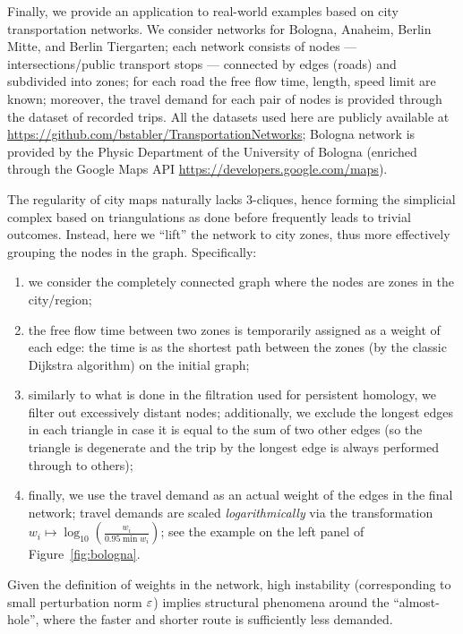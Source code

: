 Finally, we provide an application to  real-world examples based on city transportation networks. 
We consider networks for Bologna, Anaheim, Berlin Mitte, and Berlin Tiergarten; each network consists of nodes --- intersections/public transport stops --- connected by edges (roads) and subdivided into zones; for each road the free flow time, length, speed limit are known; moreover, the travel demand for each pair of nodes is provided through the dataset of recorded trips.
All the datasets used here are publicly available at \url{https://github.com/bstabler/TransportationNetworks}; Bologna network is  provided by the Physic Department of the University of Bologna (enriched through the Google Maps API \url{https://developers.google.com/maps}).

The regularity of city maps naturally lacks $3$-cliques, hence forming the simplicial complex based on triangulations as done before frequently leads to trivial outcomes. 
Instead, here we ``lift'' the network to city zones, thus more effectively grouping the nodes in the graph. Specifically:
\begin{enumerate}
    \item we consider the completely connected graph where the nodes are zones in the city/region;
    \item the free flow time between two zones is temporarily assigned  as a weight of each edge: the time is as the shortest path between the zones (by the classic Dijkstra algorithm) 
    on the initial graph;
    \item similarly to what is done in the filtration used for persistent homology,  we filter out excessively distant nodes; additionally, we exclude the longest edges in each triangle in case it is equal to the sum of two other edges (so the triangle is degenerate and the trip by the longest edge is always performed through to others); 
    \item finally, we use the travel demand as an actual weight of the edges in the final network; travel demands are scaled \emph{logarithmically} via the transformation $w_i \mapsto \log_{10} \left(  \frac{w_i}{0.95 \min w_i} \right)$; see the example on the left panel of Figure~\ref{fig:bologna}.
\end{enumerate}
Given the definition of weights in the network, high instability (corresponding to small perturbation norm $\varepsilon$) implies structural phenomena around the ``almost-hole'', where the faster and shorter route is sufficiently less demanded. 

